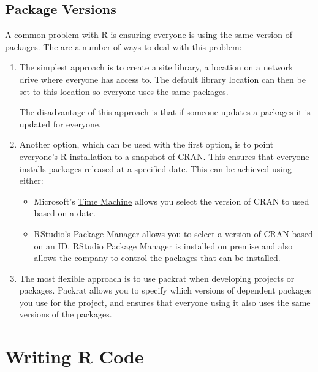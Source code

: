 \documentclass[]{book}
\begin{document}
\hypertarget{package-versions}{%
\section{Package Versions}\label{package-versions}}

A common problem with R is ensuring everyone is using the same version of packages. The
are a number of ways to deal with this problem:

\begin{enumerate}
\def\labelenumi{\arabic{enumi}.}
\item
  The simplest approach is to create a site library, a location on a network drive where
  everyone has access to. The default library location can then be set to this location so
  everyone uses the same packages.

  The disadvantage of this approach is that if someone updates a packages it is updated
  for everyone.
\item
  Another option, which can be used with the first option, is to point everyone's R installation
  to a snapshot of CRAN. This ensures that everyone installs packages released at a specified
  date. This can be achieved using either:

  \begin{itemize}
  \item
    Microsoft's \href{https://mran.microsoft.com/timemachine}{Time Machine} allows you select the
    version of CRAN to used based on a date.
  \item
    RStudio's \href{https://www.rstudio.com/products/package-manager/}{Package Manager} allows you to
    select a version of CRAN based on an ID. RStudio Package Manager is installed on premise and
    also allows the company to control the packages that can be installed.
  \end{itemize}
\item
  The most flexible approach is to use \href{development.html\#packrat}{packrat} when developing
  projects or packages. Packrat allows you to specify which versions of dependent packages you
  use for the project, and ensures that everyone using it also uses the same versions of
  the packages.
\end{enumerate}

\hypertarget{writing}{%
\chapter{Writing R Code}\label{writing}}
\end{document}
